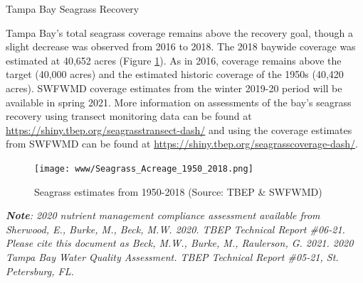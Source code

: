 \documentclass[final,t]{beamer}\usepackage[]{graphicx}\usepackage[]{color}
\begin{document}
\begin{frame}
\begin{columns}[t]
\begin{column}{.79\linewidth}
\vspace{-0.4in}

\begin{block}{Tampa Bay Seagrass Recovery}
\vspace{-0.15in}
\begin{minipage}{0.6\textwidth}
\footnotesize
Tampa Bay's total seagrass coverage remains above the recovery goal, though a slight decrease was observed from 2016 to 2018. The 2018 baywide coverage was estimated at 40,652 acres (Figure \ref{fig:sgtrnd}). As in 2016, coverage remains above the target (40,000 acres) and the estimated historic coverage of the 1950s (40,420 acres). SWFWMD coverage estimates from the winter 2019-20 period will be available in spring 2021. More information on assessments of the bay's seagrass recovery using transect monitoring data can be found at \href{https://shiny.tbep.org/seagrasstransect-dash/}{https://shiny.tbep.org/seagrasstransect-dash/} and using the coverage estimates from SWFWMD can be found at \href{https://shiny.tbep.org/seagrasscoverage-dash/}{https://shiny.tbep.org/seagrasscoverage-dash/}.
\end{minipage}
\hspace{0.2in}
\begin{minipage}{0.32\textwidth}
\vspace{0.1in}
\begin{figure}
\texttt{[image: www/Seagrass\_Acreage\_1950\_2018.png]}
\caption{\footnotesize Seagrass estimates from 1950-2018 (Source: TBEP \& SWFWMD)}
\label{fig:sgtrnd}
\end{figure}
\end{minipage}
\end{block}

\vspace{-0.1in}

\tiny \textit{\textbf{Note}: 2020 nutrient management compliance assessment available from Sherwood, E., Burke, M., Beck, M.W. 2020. TBEP Technical Report \#06-21.  Please cite this document as Beck, M.W., Burke, M., Raulerson, G. 2021. 2020 Tampa Bay Water Quality Assessment. TBEP Technical Report \#05-21, St. Petersburg, FL.} \\

\end{column}

\end{columns}

\end{frame}
\end{document}
